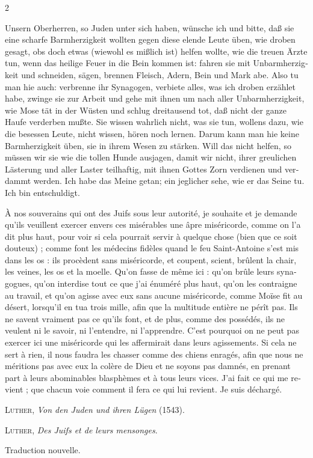 \documentclass[a4paper,12pt]{article}
\newcommand\chunks[2]{%
\begin{leftcolumn*}\begin{otherlanguage}{german}%
{#1}%
\end{otherlanguage}\end{leftcolumn*}%
\begin{rightcolumn}\begin{otherlanguage}{french}%
{#2}%
\end{otherlanguage}\end{rightcolumn}%
}
\begin{document}
\begin{paracol}{2}
  \chunks{\textelp{}}
         {\textelp{}}
  \chunks{Unsern Oberherren, so Juden unter sich haben, wünsche ich und bitte, daß sie eine scharfe Barmherzigkeit wollten gegen diese elende Leute üben, wie droben gesagt, obs doch etwas (wiewohl es mißlich ist) helfen wollte, wie die treuen Ärzte tun, wenn das heilige Feuer in die Bein kommen ist: fahren sie mit Unbarmherzigkeit und schneiden, sägen, brennen Fleisch, Adern, Bein und Mark abe. Also tu man hie auch: verbrenne ihr Synagogen, verbiete alles, was ich droben erzählet habe, zwinge sie zur Arbeit und gehe mit ihnen um nach aller Unbarmherzigkeit, wie Mose tät in der Wüsten und schlug dreitausend tot, daß nicht der ganze Haufe verderben mußte. Sie wissen wahrlich nicht, was sie tun, wollens dazu, wie die besessen Leute, nicht wissen, hören noch lernen. Darum kann man hie keine Barmherzigkeit üben, sie in ihrem Wesen zu stärken. Will das nicht helfen, so müssen wir sie wie die tollen Hunde ausjagen, damit wir nicht, ihrer greulichen Lästerung und aller Laster teilhaftig, mit ihnen Gottes Zorn verdienen und verdammt werden. Ich habe das Meine getan; ein jeglicher sehe, wie er das Seine tu. Ich bin entschuldigt.}
         {À nos souverains qui ont des Juifs sous leur autorité, je souhaite et je demande qu’ils veuillent exercer envers ces misérables une âpre miséricorde, comme on l’a dit plus haut, pour voir si cela pourrait servir à quelque chose (bien que ce soit douteux) ; comme font les médecins fidèles quand le feu Saint-Antoine s’est mis dans les os : ils procèdent sans miséricorde, et coupent, scient, brûlent la chair, les veines, les os et la moelle. Qu’on fasse de même ici : qu’on brûle leurs synagogues, qu’on interdise tout ce que j’ai énuméré plus haut, qu’on les contraigne au travail, et qu’on agisse avec eux sans aucune miséricorde, comme Moïse fit au désert, lorsqu’il en tua trois mille, afin que la multitude entière ne pérît pas. Ils ne savent vraiment pas ce qu’ils font, et de plus, comme des possédés, ils ne veulent ni le savoir, ni l’entendre, ni l’apprendre. C’est pourquoi on ne peut pas exercer ici une miséricorde qui les affermirait dans leurs agissements. Si cela ne sert à rien, il nous faudra les chasser comme des chiens enragés, afin que nous ne méritions pas avec eux la colère de Dieu et ne soyons pas damnés, en prenant part à leurs abominables blasphèmes et à tous leurs vices. J’ai fait ce qui me revient ; que chacun voie comment il fera ce qui lui revient. Je suis déchargé.}

  \chunks{\begin{flushright}
          \large\textsc{Luther}, \textit{Von den Juden und ihren Lügen} (1543).
          \end{flushright}}
         {\begin{flushright}
          \large\textsc{Luther}, \textit{Des Juifs et de leurs mensonges}.\par
          \normalsize Traduction nouvelle.
          \end{flushright}}
\end{paracol}


\end{document}
